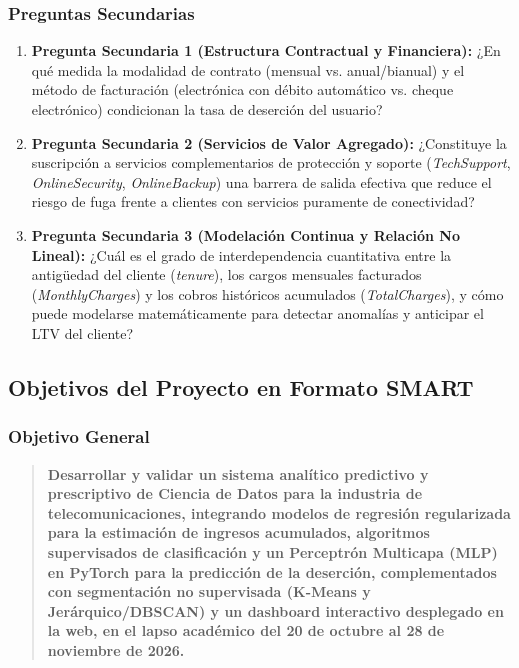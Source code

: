 \documentclass[11pt,letterpaper]{article}
\begin{document}
\subsubsection{Preguntas Secundarias}
\begin{enumerate}
    \item \textbf{Pregunta Secundaria 1 (Estructura Contractual y Financiera):} ¿En qué medida la modalidad de contrato (mensual vs. anual/bianual) y el método de facturación (electrónica con débito automático vs. cheque electrónico) condicionan la tasa de deserción del usuario?
    \item \textbf{Pregunta Secundaria 2 (Servicios de Valor Agregado):} ¿Constituye la suscripción a servicios complementarios de protección y soporte (\textit{TechSupport}, \textit{OnlineSecurity}, \textit{OnlineBackup}) una barrera de salida efectiva que reduce el riesgo de fuga frente a clientes con servicios puramente de conectividad?
    \item \textbf{Pregunta Secundaria 3 (Modelación Continua y Relación No Lineal):} ¿Cuál es el grado de interdependencia cuantitativa entre la antigüedad del cliente (\textit{tenure}), los cargos mensuales facturados (\textit{MonthlyCharges}) y los cobros históricos acumulados (\textit{TotalCharges}), y cómo puede modelarse matemáticamente para detectar anomalías y anticipar el LTV del cliente?
\end{enumerate}

\subsection{Objetivos del Proyecto en Formato SMART}

\subsubsection{Objetivo General}
\begin{quote}
    \textbf{Desarrollar y validar un sistema analítico predictivo y prescriptivo de Ciencia de Datos para la industria de telecomunicaciones, integrando modelos de regresión regularizada para la estimación de ingresos acumulados, algoritmos supervisados de clasificación y un Perceptrón Multicapa (MLP) en PyTorch para la predicción de la deserción, complementados con segmentación no supervisada (K-Means y Jerárquico/DBSCAN) y un dashboard interactivo desplegado en la web, en el lapso académico del 20 de octubre al 28 de noviembre de 2026.}
\end{quote}
\end{document}
